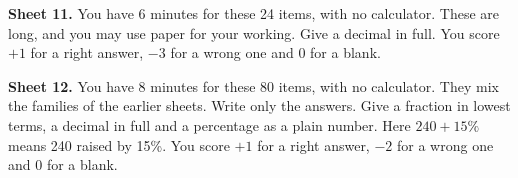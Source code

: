 \begin{question}\label{iq:iv1:speed-drills:11}
\textbf{Sheet 11.} You have 6 minutes for these 24 items, with no calculator. These are long, and you may use paper for your working. Give a decimal in full. You score $+1$ for a right answer, $-3$ for a wrong one and 0 for a blank.

\end{question}
\clearpage

\begin{question}\label{iq:iv1:speed-drills:12}
\textbf{Sheet 12.} You have 8 minutes for these 80 items, with no calculator. They mix the families of the earlier sheets. Write only the answers. Give a fraction in lowest terms, a decimal in full and a percentage as a plain number. Here $240 + 15\%$ means 240 raised by 15\%. You score $+1$ for a right answer, $-2$ for a wrong one and 0 for a blank.

\end{question}
